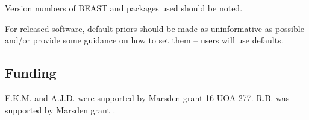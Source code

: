 \documentclass[oneside]{article}
\begin{document}
Version numbers of BEAST and packages used should be noted.

For released software, default priors should be made as uninformative as 
possible and/or provide some guidance on how to set them -- users will use defaults.

\subsection*{Funding}
F.K.M. and A.J.D. were supported by Marsden grant 16-UOA-277. R.B. was
supported by Marsden grant .






\end{document}
